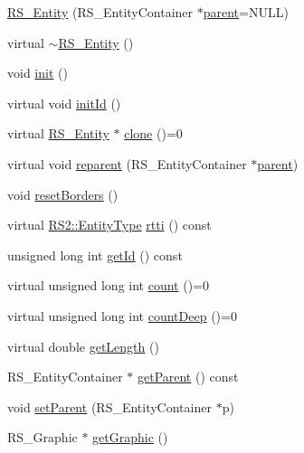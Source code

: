 \begin{DoxyCompactItemize}
\item 
\hyperlink{class_r_s___entity_ad6f5b82c91b5f64a46379429f473c61b}{R\-S\-\_\-\-Entity} (R\-S\-\_\-\-Entity\-Container $\ast$\hyperlink{class_r_s___entity_a80358a8d2fc6739a516a278dc500b49f}{parent}=N\-U\-L\-L)
\item 
virtual \hyperlink{class_r_s___entity_aa074f9cff3e4e2384c758cd460117384}{$\sim$\-R\-S\-\_\-\-Entity} ()
\item 
void \hyperlink{class_r_s___entity_ae1949b4574b0b5174c31533e9ef7ae91}{init} ()
\item 
virtual void \hyperlink{class_r_s___entity_a83fe7ead5fa03422c033b1a2ea4698b0}{init\-Id} ()
\item 
virtual \hyperlink{class_r_s___entity}{R\-S\-\_\-\-Entity} $\ast$ \hyperlink{class_r_s___entity_a2c8b66a597267e25bb1daf49f9e19d80}{clone} ()=0
\item 
virtual void \hyperlink{class_r_s___entity_a01bf073515b5e3892ad9d79b00bb073f}{reparent} (R\-S\-\_\-\-Entity\-Container $\ast$\hyperlink{class_r_s___entity_a80358a8d2fc6739a516a278dc500b49f}{parent})
\item 
void \hyperlink{class_r_s___entity_a5816e88af4f089eae4b956644b26f9ea}{reset\-Borders} ()
\item 
virtual \hyperlink{class_r_s2_a8f26d1b981e1e85cff16738b43337e6a}{R\-S2\-::\-Entity\-Type} \hyperlink{class_r_s___entity_a1d50dcc5016e016c0b944deb1b685cf1}{rtti} () const 
\item 
unsigned long int \hyperlink{class_r_s___entity_a181288256610634e356ed4b113f6ebc6}{get\-Id} () const 
\item 
virtual unsigned long int \hyperlink{class_r_s___entity_a869d21b67b2a3de5821c3c5ae4828b28}{count} ()=0
\item 
virtual unsigned long int \hyperlink{class_r_s___entity_a2949d5df3f28818e0732088a9f5b5b0d}{count\-Deep} ()=0
\item 
virtual double \hyperlink{class_r_s___entity_ab7761acd813ca852afd87130c302cadd}{get\-Length} ()
\item 
R\-S\-\_\-\-Entity\-Container $\ast$ \hyperlink{class_r_s___entity_aa7bfa0240b70dae68e865af93a80ce9f}{get\-Parent} () const 
\item 
void \hyperlink{class_r_s___entity_a4a52c5b939daa95d30872cb1eea2d426}{set\-Parent} (R\-S\-\_\-\-Entity\-Container $\ast$p)
\item 
R\-S\-\_\-\-Graphic $\ast$ \hyperlink{class_r_s___entity_a996501bf7914fc5f2f0b5c587d7668fd}{get\-Graphic} ()

\end{DoxyCompactItemize}
